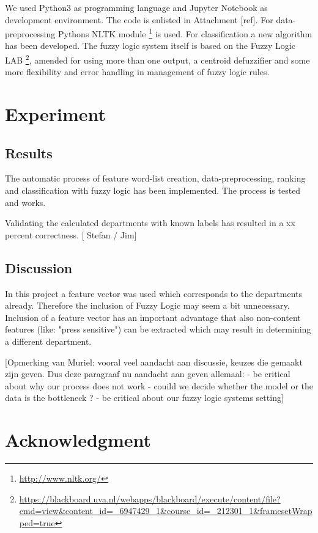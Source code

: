 \documentclass[journal]{IEEEtran}
\begin{document}
We used Python3 as programming language and Jupyter Notebook as development
environment. The code is enlisted in Attachment [ref]. For data-preprocessing Pythons NLTK module \footnote{\url{http://www.nltk.org/}} is used. For classification a new algorithm has been developed. The fuzzy logic system itself is based on the Fuzzy Logic LAB \footnote{\url{https://blackboard.uva.nl/webapps/blackboard/execute/content/file?cmd=view&content_id=_6947429_1&course_id=_212301_1&framesetWrapped=true}}, amended for using more than one output, a centroid defuzzifier and some more flexibility and error handling in management of fuzzy logic rules.

\section{Experiment}

\subsection{Results}

The automatic process of feature word-list creation, data-preprocessing, ranking and classification with fuzzy logic has been implemented. The process is tested and works.

Validating the calculated departments with known labels has resulted in a xx percent correctness. [ Stefan / Jim]

\subsection{Discussion}

In this project a feature vector was used which corresponds to the departments already. Therefore the inclusion of Fuzzy Logic may seem a bit unnecessary. Inclusion of a feature vector has an important advantage that also non-content features (like: "press sensitive") can be extracted which may result in determining a different department. 

[Opmerking van Muriel: vooral veel aandacht aan discussie, keuzes die gemaakt zijn geven. Dus deze paragraaf nu aandacht aan geven allemaal: 
- be critical about why our process does not work
- couild we decide whether the model or the data is the bottleneck ? 
- be critical about our fuzzy logic systems setting]


\section{Acknowledgment}
\end{document}
